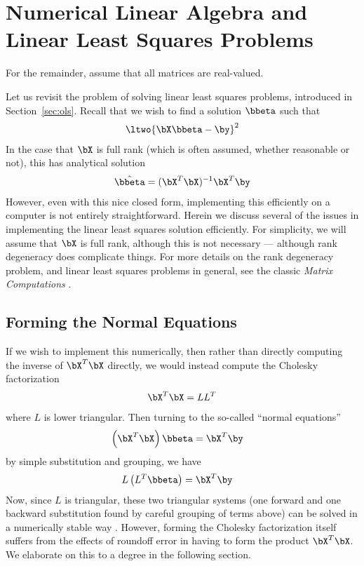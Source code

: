 \chapter{Numerical Linear Algebra and Linear Least Squares Problems}
\label{apx:numlinalg}

\vspace{0.5cm}


For the remainder, assume that all matrices are real-valued.

Let us revisit the problem of solving linear least squares problems, introduced in Section~\ref{sec:ols}.  Recall that we wish to find a solution $\bbeta$ such that
\begin{align*}
\ltwo{ \bX\bbeta - \by }^2
\end{align*}
In the case that $\bX$ is full rank (which is often assumed, whether reasonable or not), this has analytical solution
\begin{align}
 \hat{\bbeta} = (\bX^T\bX)^{-1}\bX^T\by \label{math:ols2}
\end{align}
However, even with this nice closed form, implementing this efficiently on a computer is not entirely straightforward.  Herein we discuss several of the issues in implementing the linear least squares solution efficiently.  For simplicity, we will assume that $\bX$ is full rank, although this is not necessary --- although rank degeneracy does complicate things.  For more details on the rank degeneracy problem, and linear least squares problems in general, see the classic \emph{Matrix Computations} \citep{gvl}.




\section{Forming the Normal Equations}
\label{asec:nrmleq}
If we wish to implement this numerically, then rather than directly computing the inverse of $\bX^T\bX$ directly, we would instead compute the Cholesky factorization
\begin{align*}
\bX^T\bX = LL^T
\end{align*}
where $L$ is lower triangular.  Then turning to the so-called ``normal equations''
\begin{align}
 \left(\bX^T\bX\right)\bbeta &= \bX^T\by\label{math:normeq}
\end{align}
by simple substitution and grouping, we have
\begin{align*}
L\left(L^T\bbeta\right) &= \bX^T\by
\end{align*}
Now, since $L$ is triangular, these two triangular systems (one forward and one backward substitution found by careful grouping of terms above) can be solved in a numerically stable way \citep{numericalstab}.  However, forming the Cholesky factorization itself suffers from the effects of roundoff error in having to form the product $\bX^T\bX$.  We elaborate on this to a degree in the following section.




